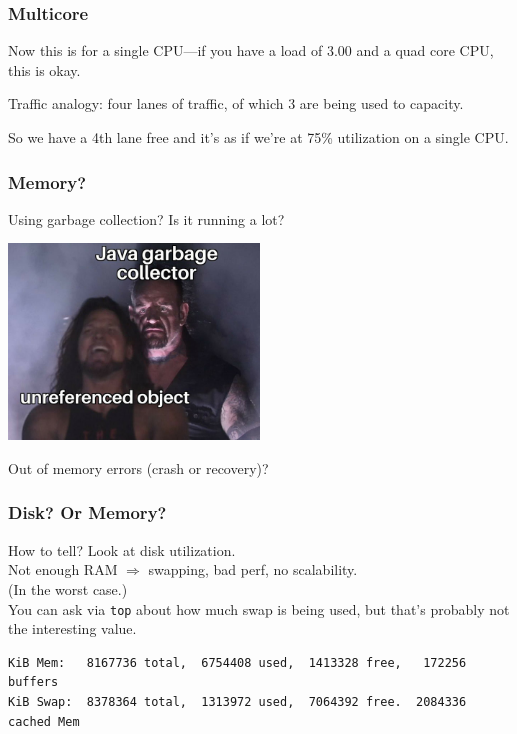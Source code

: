 \begin{frame}
\frametitle{Multicore}



Now this is for a single CPU---if you have a load of 3.00 and a quad core CPU, this is okay. 

Traffic analogy: four lanes of traffic, of which 3 are being used to capacity.

So we have a 4th lane free and it's as if we're at 75\% utilization on a single CPU.


\end{frame}

\begin{frame}
\frametitle{Memory?}

Using garbage collection? Is it running a lot?

\begin{center}
  \includegraphics[width=0.5\textwidth]{images/undertaker.jpg}
\end{center}

Out of memory errors (crash or recovery)?

\end{frame}


\begin{frame}[fragile]
\frametitle{Disk? Or Memory?}



How to tell? Look at disk utilization. \\[1em]

Not enough RAM $\Rightarrow$ swapping, bad perf, no scalability.\\[1em]

(In the worst case.)\\[1em]

You can ask via \texttt{top} about how much swap is being used, but that's probably not the interesting value. 

{\scriptsize
\begin{verbatim}
KiB Mem:   8167736 total,  6754408 used,  1413328 free,   172256 buffers
KiB Swap:  8378364 total,  1313972 used,  7064392 free.  2084336 cached Mem
\end{verbatim}
}


\end{frame}



